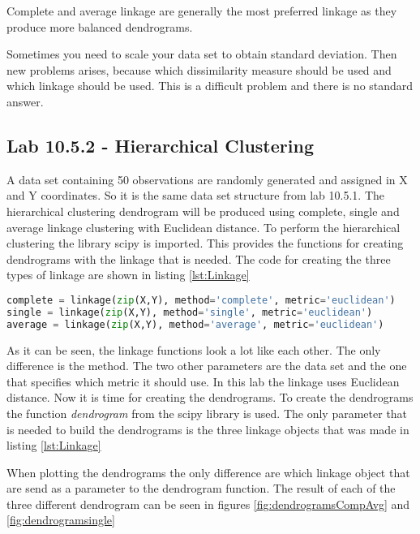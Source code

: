 Complete and average linkage are generally the most preferred linkage as they produce more balanced dendrograms. 

Sometimes you need to scale your data set to obtain standard deviation. Then new problems arises, because which dissimilarity measure should be used and which linkage should be used. This is a difficult problem and there is no standard answer.

\subsection{Lab 10.5.2 - Hierarchical Clustering}
A data set containing 50 observations are randomly generated and assigned in X and Y coordinates. So it is the same data set structure from lab 10.5.1.
The hierarchical clustering dendrogram will be produced using complete, single and average linkage clustering with Euclidean distance.
To perform the hierarchical clustering the library scipy is imported. This provides the functions for creating dendrograms with the linkage that is needed. 
The code for creating the three types of linkage are shown in listing
\ref{lst:Linkage}

\begin{lstlisting}[language=Python, label=lst:Linkage, caption=The code that apllies the three different linkage on the data set]
complete = linkage(zip(X,Y), method='complete', metric='euclidean')
single = linkage(zip(X,Y), method='single', metric='euclidean') 
average = linkage(zip(X,Y), method='average', metric='euclidean')
\end{lstlisting}

As it can be seen, the linkage functions look a lot like each other. The only difference is the method. The two other parameters are the data set and the one that specifies which metric it should use. In this lab the linkage uses Euclidean distance. 
Now it is time for creating the dendrograms. To create the dendrograms the function \emph{dendrogram} from the scipy library is used. The only parameter that is needed to build the dendrograms is the three linkage objects that was made in listing \ref{lst:Linkage}

When plotting the dendrograms the only difference are which linkage object that are send as a parameter to the dendrogram function.
The result of each of the three different dendrogram can be seen in figures \ref{fig:dendrogramsCompAvg} and \ref{fig:dendrogramsingle}




